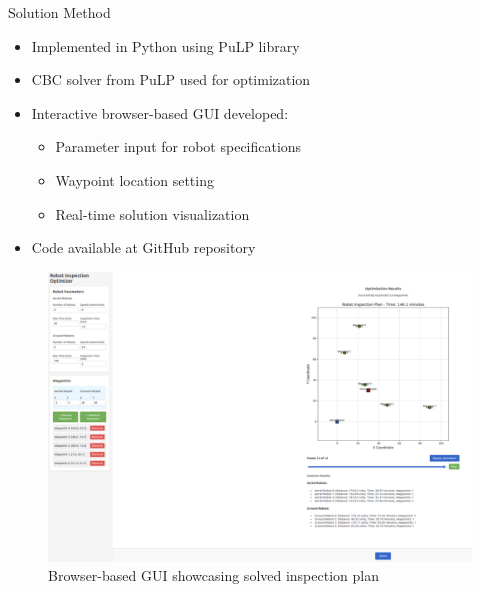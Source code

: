 \documentclass[11pt,xcolor={dvipsnames},hyperref={pdftex,pdfpagemode=UseNone,hidelinks,pdfdisplaydoctitle=true},usepdftitle=false]{beamer}
\begin{document}
    \begin{frame}{Solution Method}
      \begin{itemize}
        \item Implemented in Python using PuLP library
        \item CBC solver from PuLP used for optimization
        \item Interactive browser-based GUI developed:
          \begin{itemize}
            \item Parameter input for robot specifications
            \item Waypoint location setting
            \item Real-time solution visualization
          \end{itemize}
        \item Code available at GitHub repository
      \end{itemize}
      
      \begin{figure}
        \centering
        \includegraphics[width=0.7\linewidth]{figures/insp.pdf}
        \caption{Browser-based GUI showcasing solved inspection plan}
      \end{figure}
    \end{frame}
\end{document}
